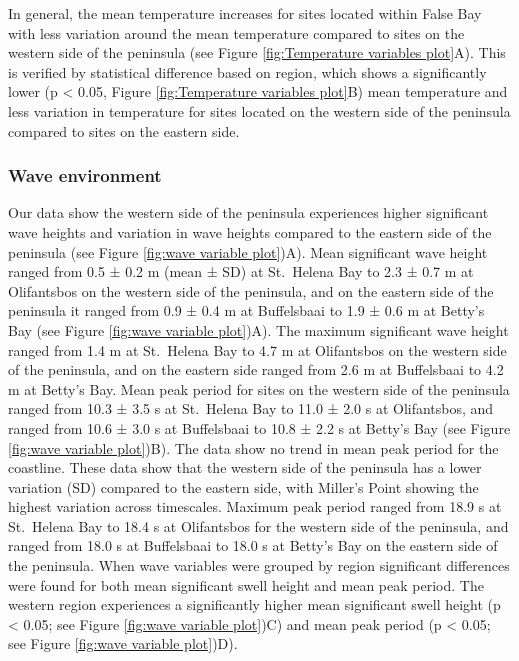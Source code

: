 \documentclass[
  a4paper,
]{article}
\begin{document}
In general, the mean temperature increases for sites located within
False Bay with less variation around the mean temperature compared to
sites on the western side of the peninsula (see Figure
\ref{fig:Temperature variables plot}A). This is verified by statistical
difference based on region, which shows a significantly lower (p
\textless{} 0.05, Figure \ref{fig:Temperature variables plot}B) mean
temperature and less variation in temperature for sites located on the
western side of the peninsula compared to sites on the eastern side.

\hypertarget{wave-environment-1}{%
\subsubsection{Wave environment}\label{wave-environment-1}}

Our data show the western side of the peninsula experiences higher
significant wave heights and variation in wave heights compared to the
eastern side of the peninsula (see Figure
\ref{fig:wave variable plot})A). Mean significant wave height ranged
from 0.5 ± 0.2 m (mean ± SD) at St.~Helena Bay to 2.3 ± 0.7 m at
Olifantsbos on the western side of the peninsula, and on the eastern
side of the peninsula it ranged from 0.9 ± 0.4 m at Buffelsbaai to 1.9 ±
0.6 m at Betty's Bay (see Figure \ref{fig:wave variable plot})A). The
maximum significant wave height ranged from 1.4 m at St.~Helena Bay to
4.7 m at Olifantsbos on the western side of the peninsula, and on the
eastern side ranged from 2.6 m at Buffelsbaai to 4.2 m at Betty's Bay.
Mean peak period for sites on the western side of the peninsula ranged
from 10.3 ± 3.5 s at St.~Helena Bay to 11.0 ± 2.0 s at Olifantsbos, and
ranged from 10.6 ± 3.0 s at Buffelsbaai to 10.8 ± 2.2 s at Betty's Bay
(see Figure \ref{fig:wave variable plot})B). The data show no trend in
mean peak period for the coastline. These data show that the western
side of the peninsula has a lower variation (SD) compared to the eastern
side, with Miller's Point showing the highest variation across
timescales. Maximum peak period ranged from 18.9 s at St.~Helena Bay to
18.4 s at Olifantsbos for the western side of the peninsula, and ranged
from 18.0 s at Buffelsbaai to 18.0 s at Betty's Bay on the eastern side
of the peninsula. When wave variables were grouped by region significant
differences were found for both mean significant swell height and mean
peak period. The western region experiences a significantly higher mean
significant swell height (p \textless{} 0.05; see Figure
\ref{fig:wave variable plot})C) and mean peak period (p \textless{}
0.05; see Figure \ref{fig:wave variable plot})D).
\end{document}
